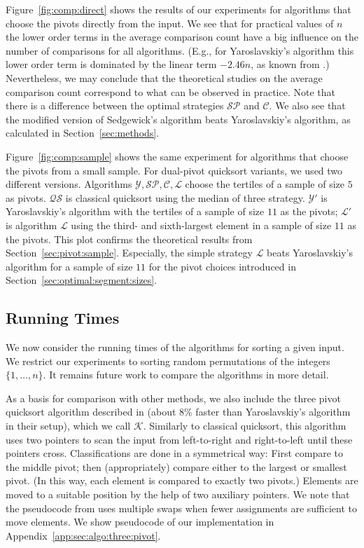 \documentclass[prodmode,acmtalg]{acmsmall}
\begin{document}
Figure~\ref{fig:comp:direct} shows the results of our experiments for algorithms
that choose the pivots directly from the input. We see that for practical values of $n$  
the lower order terms in the average comparison count have a big influence on the
number of comparisons for all algorithms. (E.g., for Yaroslavskiy's algorithm this lower order term 
is dominated by the linear term
$-2.46n$, as known from \cite{nebel12}.)  
Nevertheless, we may conclude that the theoretical studies on the average 
comparison count correspond to what can be observed in practice.
Note that there is a difference between
the optimal strategies $\mathcal{SP}$ and $\mathcal{C}$. 
We also see that the modified version of Sedgewick's algorithm beats
Yaroslavskiy's algorithm, as calculated in Section~\ref{sec:methods}.

Figure~\ref{fig:comp:sample} shows the same experiment for algorithms that
choose the pivots from a small sample. For dual-pivot quicksort variants, we used
two different versions. Algorithms $\mathcal{Y},\mathcal{SP},\mathcal{C},\mathcal{L}$ choose 
the tertiles of a sample of size $5$ as pivots. $\mathcal{QS}$ is classical quicksort using the 
median of three strategy. $\mathcal{Y}'$ is Yaroslavskiy's algorithm with the tertiles of 
a sample of size $11$ as the pivots; $\mathcal{L}'$ is algorithm $\mathcal{L}$ using the 
third- and sixth-largest element in a sample of size $11$ as the pivots. 
This plot confirms the theoretical results from Section~\ref{sec:pivot:sample}. Especially,
the simple strategy $\mathcal{L}$ beats Yaroslavskiy's algorithm for a sample of size $11$ for 
the pivot choices introduced in Section~\ref{sec:optimal:segment:sizes}.

\subsection{Running Times}\label{sec:running:times} We now consider the running
times of the algorithms for sorting a given input.  We restrict our experiments to
sorting random permutations of the integers $\{1,\ldots,n\}$. It remains future
work to compare the algorithms in more detail.

As a basis for comparison with other methods, we also include the three pivot quicksort
algorithm described in \cite{Kushagra14} (about 8\% faster than
Yaroslavskiy's algorithm in their setup), which we call $\mathcal{K}$.
Similarly to classical quicksort, this algorithm uses two pointers to scan the
input from left-to-right and right-to-left until these pointers cross.
Classifications are done in a symmetrical way: First compare to the
middle pivot; then (appropriately) compare either to the largest or
smallest pivot. (In this way, each element is compared to exactly two
pivots.) Elements are moved to a suitable position by the help of two
auxiliary pointers. We note that the pseudocode from \cite[Algorithm
A.1.1]{Kushagra14} uses multiple swaps when fewer assignments are sufficient to
move elements.  We show pseudocode of our implementation in
Appendix~\ref{app:sec:algo:three:pivot}.
\end{document}
